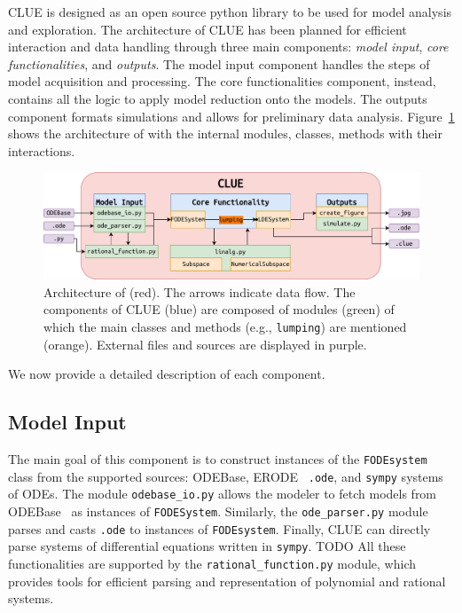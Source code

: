 CLUE is designed as an open source python library to be used for model analysis and exploration.
The architecture of CLUE has been planned for efficient interaction and data handling through three main components:
\emph{ model input}, \emph{core functionalities}, and \emph{outputs}. 
The model input component handles the steps of model acquisition and processing.
The core functionalities component, instead, contains all the logic to apply model reduction onto the models.
The outputs component formats simulations and allows for preliminary data analysis. 
Figure~\ref{fig:clue_arch} shows the architecture of \ToolName with the internal modules, classes, methods with their interactions.
\begin{figure}
	\centering
	\includegraphics[width=\textwidth]{img/clue.pdf}
	\caption{Architecture of \ToolName(red).
        The arrows indicate data flow.
        The components of CLUE (blue) are composed of modules (green) of which the main classes and methods (e.g., \texttt{lumping}) are mentioned (orange).
        External files and sources are displayed in purple.
     }
	\label{fig:clue_arch}
\end{figure}
We now provide a detailed description of each component.

\subsection{Model Input}
The main goal of this component is to construct instances of  the \texttt{FODEsystem} class from the supported sources: ODEBase,  ERODE~\cite{cardelli_erode_2017} \texttt{.ode}, and \texttt{sympy} systems of ODEs.
The module \texttt{odebase\_io.py} allows the modeler to fetch models from ODEBase~\cite{LuedersSturmRadulescu22} as instances of \texttt{FODESystem}.
Similarly, the \texttt{ode\_parser.py} module parses and casts \texttt{.ode}  to instances of \texttt{FODEsystem}. 
Finally, CLUE can directly parse systems of differential equations written in \texttt{sympy}. 
TODO
All these functionalities are supported by the \texttt{rational\_function.py} module, which provides tools for efficient parsing and representation of polynomial and rational systems.

